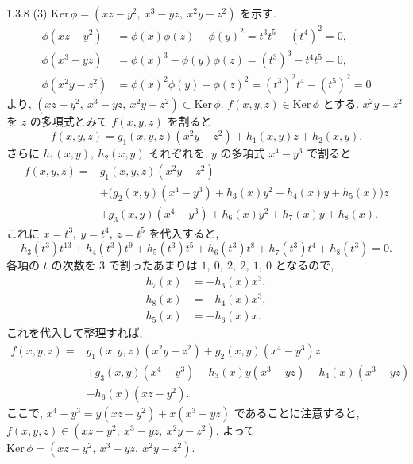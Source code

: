\begin{ans}{1.3.8}
  \medskip
  (3) $\mathrm{Ker}\,\phi = (xz - y^2,\ x^3 - yz,\ x^2 y - z^2)$ を示す.
  \begin{align*}
    \phi(xz - y^2) &= \phi(x)\phi(z) - \phi(y)^2 = t^3 t^5 - (t^4)^2 = 0, \\
    \phi(x^3 - yz) &= \phi(x)^3 - \phi(y)\phi(z) = (t^3)^3 - t^4 t^5 = 0, \\
    \phi(x^2 y - z^2) &= \phi(x)^2 \phi(y) - \phi(z)^2 = (t^3)^2 t^4 - (t^5)^2 = 0
  \end{align*}
  より, $(xz - y^2,\ x^3 - yz,\ x^2 y - z^2) \subset \mathrm{Ker}\,\phi$.
  $f(x,y,z) \in \mathrm{Ker}\,\phi$ とする.
  $x^2 y - z^2$ を $z$ の多項式とみて $f(x,y,z)$ を割ると
  \[
    f(x,y,z) = g_1(x,y,z)(x^2 y - z^2) + h_1(x,y)z + h_2(x,y).
  \]
  さらに $h_1(x,y),\ h_2(x,y)$ それぞれを, $y$ の多項式 $x^4 - y^3$ で割ると
  \begin{align*}
    f(x,y,z) = {}& g_1(x,y,z)(x^2 y - z^2) \\
    & + \bigl(g_2(x,y)(x^4 - y^3) + h_3(x)y^2 + h_4(x)y + h_5(x)\bigr)z \\
    & + g_3(x,y)(x^4 - y^3) + h_6(x)y^2 + h_7(x)y + h_8(x).
  \end{align*}
  これに $x = t^3,\ y = t^4,\ z = t^5$ を代入すると,
  \[
    h_3(t^3)t^{13} + h_4(t^3)t^9 + h_5(t^3)t^5 + h_6(t^3)t^8 + h_7(t^3)t^4 + h_8(t^3) = 0.
  \]
  各項の $t$ の次数を $3$ で割ったあまりは $1,\ 0,\ 2,\ 2,\ 1,\ 0$ となるので,
  \begin{align*}
    h_7(x) &= -h_3(x)x^3, \\
    h_8(x) &= -h_4(x)x^3, \\
    h_5(x) &= -h_6(x)x.
  \end{align*}
  これを代入して整理すれば,
  \begin{align*}
    f(x,y,z) = {}& g_1(x,y,z)(x^2 y - z^2) + g_2(x,y)(x^4 - y^3)z \\
    & + g_3(x,y)(x^4 - y^3) - h_3(x)y(x^3 - yz) - h_4(x)(x^3 - yz) \\
    & - h_6(x)(xz - y^2).
  \end{align*}
  ここで, $x^4 - y^3 = y(xz - y^2) + x(x^3 - yz)$ であることに注意すると,
  $f(x,y,z) \in (xz - y^2,\ x^3 - yz,\ x^2 y - z^2)$.
  よって $\mathrm{Ker}\,\phi = (xz - y^2,\ x^3 - yz,\ x^2 y - z^2)$.


\end{ans}

